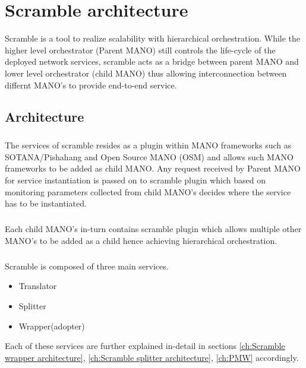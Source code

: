 \chapter{Scramble architecture}
\label{ch:Scramble architecture}

Scramble is a tool to realize scalability with hierarchical orchestration. While the higher level orchestrator (Parent MANO) still controls the life-cycle of the deployed network services, scramble acts as a bridge between parent MANO and lower level orchestrator (child MANO) thus allowing interconnection between differnt MANO's to provide end-to-end service.  
 
\section{Architecture}
\paragraph{}
The services of scramble resides as a plugin within MANO frameworks such as SOTANA/Pishahang and Open Source MANO (OSM) and allows such MANO frameworks to be added as child MANO. Any request received by Parent MANO for service instantiation is passed on to scramble plugin which based on monitoring parameters collected from child MANO's decides where the service has to be instantiated.

\paragraph{}
Each child MANO's in-turn contains scramble plugin which allows multiple other MANO's to be added as a child hence achieving hierarchical orchestration.

\paragraph{}

Scramble is composed of three main services.
\begin{itemize}
	\item Translator
	\item Splitter
	\item Wrapper(adopter)
	\end{itemize} 
Each of these services are further explained in-detail in sections \ref{ch:Scramble wrapper architecture}, \ref{ch:Scramble splitter architecture}, \ref{ch:PMW} accordingly.

